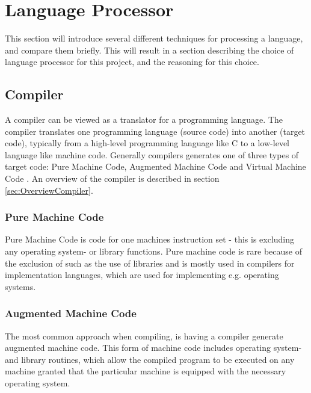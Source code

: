 \section{Language Processor}
This section will introduce several different techniques for processing a language, and compare them briefly. This will result in a section describing the choice of language processor for this project, and the reasoning for this choice.

\subsection{Compiler}
A compiler can be viewed as a translator for a programming language. The compiler translates one programming language (source code) into another (target code), typically from a high-level programming language like C to a low-level language like machine code. Generally compilers generates one of three types of target code: Pure Machine Code, Augmented Machine Code and Virtual Machine Code \citep{CraftingACompiler}. An overview of the compiler is described in section \ref{sec:OverviewCompiler}.

\subsubsection{Pure Machine Code} 
Pure Machine Code is code for one machines instruction set - this is excluding any operating system- or library functions. Pure machine code is rare because of the exclusion of such as the use of libraries and is mostly used in compilers for implementation languages, which are used for implementing e.g. operating systems.
 
\subsubsection{Augmented Machine Code}
The most common approach when compiling, is having a compiler generate augmented machine code. This form of machine code includes operating system- and library routines, which allow the compiled program to be executed on any machine granted that the particular machine is equipped with the necessary operating system.

